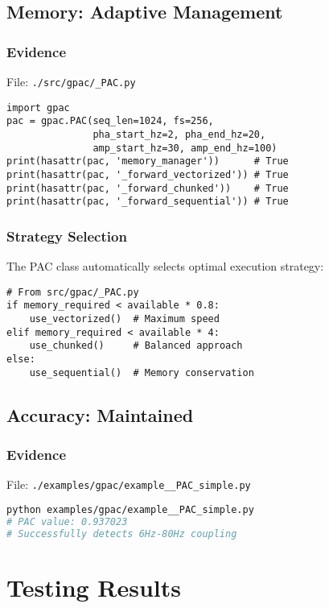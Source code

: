 \documentclass[11pt,a4paper]{article}
\begin{document}
\subsection{Memory: Adaptive Management}

\subsubsection{Evidence}
File: \texttt{./src/gpac/\_PAC.py}

\begin{lstlisting}
import gpac
pac = gpac.PAC(seq_len=1024, fs=256, 
               pha_start_hz=2, pha_end_hz=20,
               amp_start_hz=30, amp_end_hz=100)
print(hasattr(pac, 'memory_manager'))      # True
print(hasattr(pac, '_forward_vectorized')) # True
print(hasattr(pac, '_forward_chunked'))    # True
print(hasattr(pac, '_forward_sequential')) # True
\end{lstlisting}

\subsubsection{Strategy Selection}
The PAC class automatically selects optimal execution strategy:

\begin{lstlisting}
# From src/gpac/_PAC.py
if memory_required < available * 0.8:
    use_vectorized()  # Maximum speed
elif memory_required < available * 4:
    use_chunked()     # Balanced approach
else:
    use_sequential()  # Memory conservation
\end{lstlisting}

\subsection{Accuracy: Maintained}

\subsubsection{Evidence}
File: \texttt{./examples/gpac/example\_\_PAC\_simple.py}

\begin{lstlisting}[language=bash]
python examples/gpac/example__PAC_simple.py
# PAC value: 0.937023
# Successfully detects 6Hz-80Hz coupling
\end{lstlisting}

\section{Testing Results}
\end{document}
